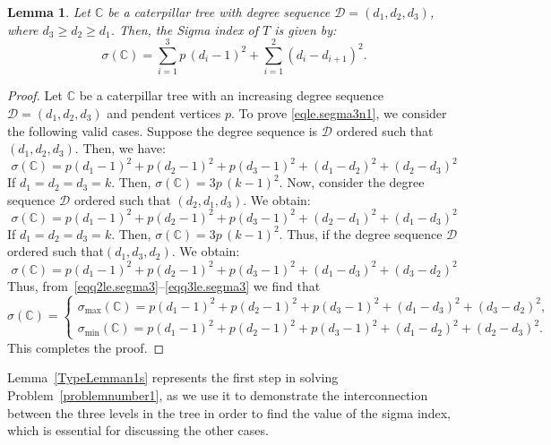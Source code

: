 \documentclass[12pt, a4paper]{article}
\theoremstyle{plain}  %
\newtheorem{lemma}[theorem]{Lemma}
\theoremstyle{definition}  %
\newcommand{\CC}{\mathbb{C}}
\begin{document}
\begin{lemma}\label{le.segma3}
Let $\CC$ be a caterpillar tree with degree sequence $ \mathscr{D} = (d_1, d_2, d_3) $, where $ d_3 \geqslant d_2 \geqslant d_1 $. Then, the Sigma index of $ T $ is given by:
\begin{equation}~\label{eqle.segma3n1}
\sigma(\CC)=\sum_{i=1}^{3} p\,(d_i-1)^2+\sum_{i=1}^{2}(d_i-d_{i+1})^2.
\end{equation}
\end{lemma}
\begin{proof}
Let $\CC$ be a caterpillar tree with an increasing degree sequence $\mathscr{D} = (d_1, d_2, d_3)$ and pendent vertices $p$. To prove \eqref{eqle.segma3n1}, we consider the following valid cases. Suppose the degree sequence is $\mathscr{D}$ ordered such that $(d_1, d_2, d_3)$. Then, we have:
\begin{equation}~\label{eqq1le.segma3}
 \sigma(\CC)=p(d_1-1)^2+p(d_2-1)^2+p(d_3-1)^2+(d_1-d_2)^2+(d_2-d_3)^2  
\end{equation}
If $d_1=d_2=d_3=k$. Then, $\sigma(\CC)=3p\,(k-1)^2$. Now, consider the degree sequence $\mathscr{D}$ ordered such that $(d_2, d_1, d_3)$. We obtain:
\begin{equation}~\label{eqq2le.segma3}
 \sigma(\CC)=p(d_1-1)^2+p(d_2-1)^2+p(d_3-1)^2+(d_2-d_1)^2+(d_1-d_3)^2   
\end{equation}
If $d_1=d_2=d_3=k$. Then, $\sigma(\CC)=3p\,(k-1)^2$. Thus, if the degree sequence $\mathscr{D}$ ordered such that$(d_1, d_3, d_2)$. We obtain:
\begin{equation}~\label{eqq3le.segma3}
 \sigma(\CC)=p(d_1-1)^2+p(d_2-1)^2+p(d_3-1)^2+(d_1-d_3)^2+(d_3-d_2)^2  
\end{equation}
Thus, from~\eqref{eqq2le.segma3}--\eqref{eqq3le.segma3} we find that 
\[
\sigma(\CC)=\begin{cases}
\sigma_{\max}(\CC)=p(d_1-1)^2+p(d_2-1)^2+p(d_3-1)^2+(d_1-d_3)^2+(d_3-d_2)^2 , \\
\sigma_{\min}(\CC)=p(d_1-1)^2+p(d_2-1)^2+p(d_3-1)^2+(d_1-d_2)^2+(d_2-d_3)^2.
\end{cases}
\]
This completes the proof.
\end{proof}
Lemma~\ref{TypeLemman1s} represents the first step in solving Problem~\ref{problemnumber1}, as we use it to demonstrate the interconnection between the three levels in the tree in order to find the value of the sigma index, which is essential for discussing the other cases.
\end{document}
